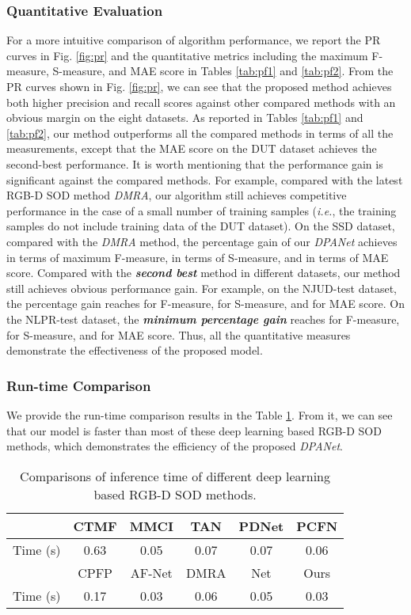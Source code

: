 \documentclass[journal]{IEEEtran}
\def\OURNET{\textit{DPANet}}
\begin{document}
\subsubsection{\textbf{Quantitative Evaluation}}
For a more intuitive comparison of algorithm performance, we report the PR curves in Fig. \ref{fig:pr} and the quantitative metrics including the maximum F-measure, S-measure, and MAE score in Tables \ref{tab:pf1} and \ref{tab:pf2}. From the PR curves shown in Fig. \ref{fig:pr}, we can see that the proposed method achieves both higher precision and recall scores against other compared methods with an obvious margin on the eight datasets. As reported in Tables \ref{tab:pf1} and \ref{tab:pf2}, our method outperforms all the compared methods in terms of all the measurements, except that the MAE score on the DUT dataset achieves the second-best performance. It is worth mentioning that the performance gain is significant against the compared methods. For example, compared with the latest RGB-D SOD method \emph{DMRA}, our algorithm still achieves competitive performance in the case of a small number of training samples (\emph{i.e.}, the training samples do not include  training data of the DUT dataset). On the SSD dataset, compared with the \emph{DMRA} method, the percentage gain of our \textit{DPANet} achieves  in terms of maximum F-measure,  in terms of S-measure, and  in terms of MAE score. Compared with the \textbf{\emph{second best}} method in different datasets, our method still achieves obvious performance gain. For example, on the NJUD-test dataset, the percentage gain reaches  for F-measure,  for S-measure, and  for MAE score. On the NLPR-test dataset, the \textbf{\emph{minimum percentage gain}} reaches  for F-measure,  for S-measure, and  for MAE score.
Thus, all the quantitative measures demonstrate the effectiveness of the proposed model. \\


\subsubsection{\textbf{Run-time Comparison}}
We provide the run-time comparison results in the Table \ref{tab:speed}. From it, we can see that our model is faster than most of these deep learning based RGB-D SOD methods, which demonstrates the efficiency of the proposed \OURNET.
\begin{table}[!t]
    \centering
    \normalsize
    \caption{Comparisons of inference time of different deep learning based RGB-D SOD methods.}
    \begin{tabular}{|c|c|c|c|c|c|}
    \hline
         & CTMF & MMCI & TAN & PDNet & PCFN   \\
    \hline
     Time (s) & 0.63 & 0.05 & 0.07 & 0.07 & 0.06  \\
     \hline
         & CPFP & AF-Net & DMRA & Net & Ours  \\
     \hline
     Time (s) & 0.17 & 0.03 & 0.06 & 0.05 & 0.03 \\
     \hline
    \end{tabular}
    \label{tab:speed}
\end{table}
\end{document}
